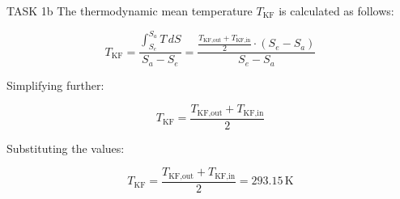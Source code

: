 TASK 1b  
The thermodynamic mean temperature \( T_{\text{KF}} \) is calculated as follows:  

\[
T_{\text{KF}} = \frac{\int_{S_e}^{S_a} T \, dS}{S_a - S_e} = \frac{\frac{T_{\text{KF,out}} + T_{\text{KF,in}}}{2} \cdot (S_e - S_a)}{S_e - S_a}
\]

Simplifying further:  

\[
T_{\text{KF}} = \frac{T_{\text{KF,out}} + T_{\text{KF,in}}}{2}
\]

Substituting the values:  

\[
T_{\text{KF}} = \frac{T_{\text{KF,out}} + T_{\text{KF,in}}}{2} = 293.15 \, \text{K}
\]